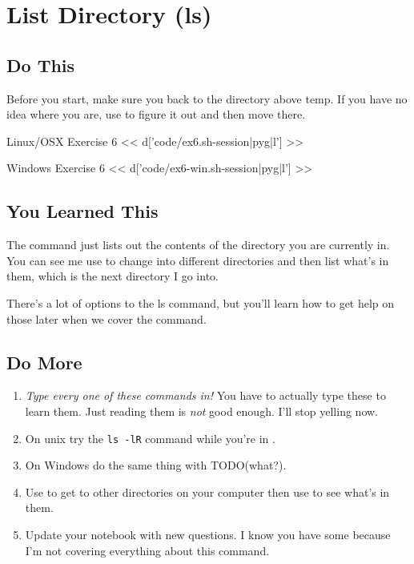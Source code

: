 \chapter{List Directory (ls)}

\section{Do This}

Before you start, make sure you  back to the directory above temp.
If you have no idea where you are, use  to figure it out and then
move there.

\begin{code}{Linux/OSX Exercise 6}
<< d['code/ex6.sh-session|pyg|l'] >>
\end{code}

\begin{code}{Windows Exercise 6}
<< d['code/ex6-win.sh-session|pyg|l'] >>
\end{code}

\section{You Learned This}

The  command just lists out the contents of the directory you
are currently in.  You can see me use  to change into different
directories and then list what's in them, which is the next directory I
go into.

There's a lot of options to the ls command, but you'll learn how to get
help on those later when we cover the  command.

\section{Do More}

\begin{enumerate}
\item \emph{Type every one of these commands in!} You have to actually type these
    to learn them.  Just reading them is \emph{not} good enough.  I'll stop yelling
    now.
\item On unix try the \verb|ls -lR| command while you're in .
\item On Windows do the same thing with TODO(what?).
\item Use  to get to other directories on your computer then use  to see what's in them.
\item Update your notebook with new questions.  I know you have some because I'm
    not covering everything about this command.
\end{enumerate}

